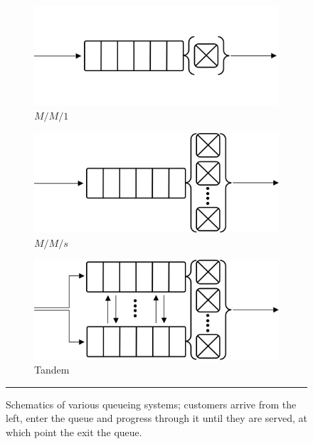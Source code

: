 \begin{figure}[!t]
\centering
\begin{subfigure}[b]{0.45\textwidth}
\includegraphics[width=\textwidth]{images/QSD/MM12.png}
\caption{\small $M/M/1$}\label{fig:MM1}
\end{subfigure}\quad
\begin{subfigure}[b]{0.45\textwidth}
\includegraphics[width=\textwidth]{images/QSD/MMc.png}
\caption{\small $M/M/s$}\label{fig:MMc}
\end{subfigure}
\begin{subfigure}[b]{0.45\textwidth}
\includegraphics[width=\textwidth]{images/QSD/Tandem.png}
\caption{\small Tandem}\label{fig:tandem}
\end{subfigure}
\caption[\small Schematics of various queueing systems]{\small Schematics of various queueing systems; customers arrive from the left, enter the queue and progress through it until they are served, at which point the exit the queue.}\label{fig:MM}\hrule
\end{figure}\afterpage{\FloatBarrier}
